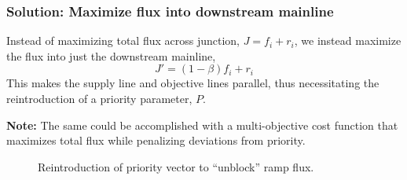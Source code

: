 \begin{frame}

	\frametitle{Solution: Maximize flux into downstream mainline}
	Instead of maximizing total flux across junction, $J = f_i + r_i$, we instead maximize the flux into just the downstream mainline,
	\begin{equation}
	J' = \left(1 - \beta \right) f_i + r_i
	\end{equation}
	This makes the supply line and objective lines parallel, thus necessitating the reintroduction of a priority parameter, $P$.

	\textbf{Note:} The same could be accomplished with a multi-objective cost function that maximizes total flux while penalizing deviations from priority.
	
 \begin{figure}[ht]
	\centering
	{
	\resizebox{.4 \columnwidth}{!}{
	}
	\caption{Reintroduction of priority vector to ``unblock'' ramp flux.}
	\label{fig:good2by2}}
 \end{figure}

\end{frame}

